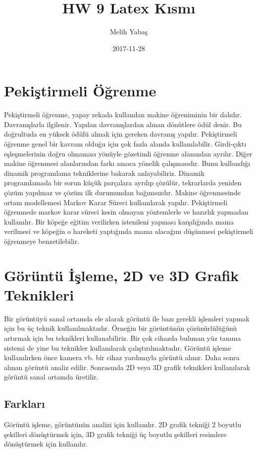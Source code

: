\documentclass[12pt]{article}\usepackage[utf8]{inputenc}
\title{HW 9 Latex Kısmı}
\date{2017-11-28}
\author{Melih Yabaş}
\begin{document}
	\maketitle
	\newpage
\section{Pekiştirmeli Öğrenme}
\flushbottom

	Pekiştirmeli öğrenme, yapay zekada kullanılan makine öğreniminin bir dalıdır. Davranışlarla ilgilenir. Yapılan davranışlardan alınan dönütlere ödül denir. Bu doğrultuda en yüksek ödülü almak için gereken davranış yapılır.
 Pekiştirmeli öğrenme genel bir kavram olduğu için çok fazla alanda kullanılabilir.
Girdi-çıktı eşleşmelerinin doğru olmaması yönüyle gözetimli öğrenme alanından ayrılır.
Diğer makine öğrenmesi alanlarından farkı amaca yönelik çalışmasıdır. Bunu kullandığı dinamik programlama tekniklerine bakarak anlayabiliriz. Dinamik programlamada bir sorun küçük parçalara ayrılıp çözülür, tekrarlarda yeniden çözüm yapılmaz ve çözüm ilk durumundan bağımsızdır.
Makine öğrenmesinde ortam modellemesi Markov Karar Süreci kullanılarak yapılır. Pekiştirmeli öğrenmede markov karar süreci kesin olmayan yöntemlerle ve hazırlık yapmadan kullanılır.
Bir köpeğe eğitim verilirken istenileni yapması karşılığında mama verilmesi ve köpeğin o hareketi yaptığında mama alacağını düşünmesi pekiştirmeli öğrenmeye benzetilebilir.


\section{Görüntü İşleme, 2D ve 3D Grafik Teknikleri}
\flushbottom
Bir görüntüyü sanal ortamda ele alarak görüntü ile bazı gerekli işlemleri yapmak için bu üç teknik kullanılmaktadır. Örneğin bir görüntünün çözünürlülüğünü artırmak için bu teknikleri kullanabiliriz. Bir çok cihazda bulunan yüz tanıma sistemi de yine bu teknikler kullanılarak çalıştırılmaktadır. 
Görüntü işleme kullanılırken önce kamera vb. bir cihaz yardımıyla görüntü alınır. Daha sonra alınan görüntü analiz edilir. Sonrasında 2D veya 3D grafik teknikleri kullanılarak görüntü sanal ortamda üretilir.
	\subsection{Farkları}
	Görüntü işleme, görüntünün analizi için kullanılır. 2D grafik tekniği 2 boyutlu şekilleri dönüştürmek için, 3D grafik tekniği üç boyutlu şekilleri resimlere dönüştürmek için kullanılır.
\end{document}
